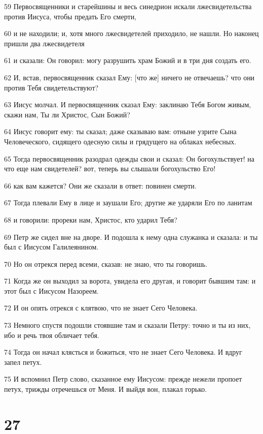 \par 59 Первосвященники и старейшины и весь синедрион искали лжесвидетельства против Иисуса, чтобы предать Его смерти,
\par 60 и не находили; и, хотя много лжесвидетелей приходило, не нашли. Но наконец пришли два лжесвидетеля
\par 61 и сказали: Он говорил: могу разрушить храм Божий и в три дня создать его.
\par 62 И, встав, первосвященник сказал Ему: [что же] ничего не отвечаешь? что они против Тебя свидетельствуют?
\par 63 Иисус молчал. И первосвященник сказал Ему: заклинаю Тебя Богом живым, скажи нам, Ты ли Христос, Сын Божий?
\par 64 Иисус говорит ему: ты сказал; даже сказываю вам: отныне узрите Сына Человеческого, сидящего одесную силы и грядущего на облаках небесных.
\par 65 Тогда первосвященник разодрал одежды свои и сказал: Он богохульствует! на что еще нам свидетелей? вот, теперь вы слышали богохульство Его!
\par 66 как вам кажется? Они же сказали в ответ: повинен смерти.
\par 67 Тогда плевали Ему в лице и заушали Его; другие же ударяли Его по ланитам
\par 68 и говорили: прореки нам, Христос, кто ударил Тебя?
\par 69 Петр же сидел вне на дворе. И подошла к нему одна служанка и сказала: и ты был с Иисусом Галилеянином.
\par 70 Но он отрекся перед всеми, сказав: не знаю, что ты говоришь.
\par 71 Когда же он выходил за ворота, увидела его другая, и говорит бывшим там: и этот был с Иисусом Назореем.
\par 72 И он опять отрекся с клятвою, что не знает Сего Человека.
\par 73 Немного спустя подошли стоявшие там и сказали Петру: точно и ты из них, ибо и речь твоя обличает тебя.
\par 74 Тогда он начал клясться и божиться, что не знает Сего Человека. И вдруг запел петух.
\par 75 И вспомнил Петр слово, сказанное ему Иисусом: прежде нежели пропоет петух, трижды отречешься от Меня. И выйдя вон, плакал горько.

\chapter{27}

